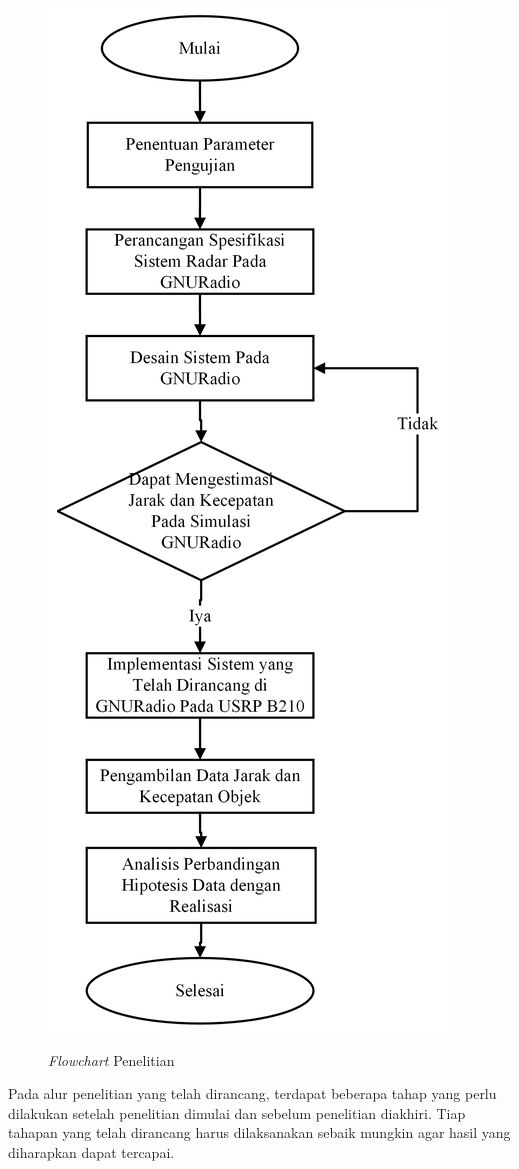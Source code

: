  \begin{figure}
	\begin{center}
		\includegraphics[scale=0.5]{pics/bab3/FlowchartTugasAkhir.png} 
		\label{img:flowchart}
		\caption[\textit{Flowchart} Penelitian]{\textit{Flowchart} Penelitian}
	\end{center}
\end{figure}
Pada alur penelitian yang telah dirancang, terdapat beberapa tahap yang perlu dilakukan setelah penelitian dimulai dan sebelum penelitian diakhiri. Tiap tahapan yang telah dirancang harus dilaksanakan sebaik mungkin agar hasil yang diharapkan dapat tercapai.
	
